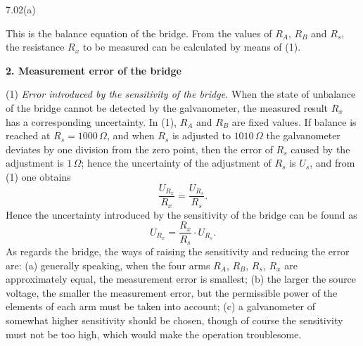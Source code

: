 \begin{figbox}{7.02(a)}
\end{figbox}

This is the balance equation of the bridge. From the values of $R_A$, $R_B$ and $R_s$, the resistance $R_x$ to be measured can be calculated by means of (1).

\textbf{2. Measurement error of the bridge}

(1) \emph{Error introduced by the sensitivity of the bridge.} When the state of unbalance of the bridge cannot be detected by the galvanometer, the measured result $R_x$ has a corresponding uncertainty. In (1), $R_A$ and $R_B$ are fixed values. If balance is reached at $R_s=1000\,\Omega$, and when $R_s$ is adjusted to $1010\,\Omega$ the galvanometer deviates by one division from the zero point, then the error of $R_s$ caused by the adjustment is $1\,\Omega$; hence the uncertainty of the adjustment of $R_s$ is $U_s$, and from (1) one obtains
\[
\frac{U_{R_x}}{R_x}=\frac{U_{R_s}}{R_s}.
\]
Hence the uncertainty introduced by the sensitivity of the bridge can be found as
\[
U_{R_x}=\frac{R_x}{R_s}\cdot U_{R_s}.
\]
As regards the bridge, the ways of raising the sensitivity and reducing the error are: (a) generally speaking, when the four arms $R_A$, $R_B$, $R_s$, $R_x$ are approximately equal, the measurement error is smallest; (b) the larger the source voltage, the smaller the measurement error, but the permissible power of the elements of each arm must be taken into account; (c) a galvanometer of somewhat higher sensitivity should be chosen, though of course the sensitivity must not be too high, which would make the operation troublesome.

